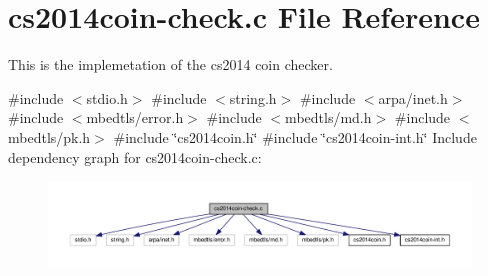 \hypertarget{cs2014coin-check_8c}{}\section{cs2014coin-\/check.c File Reference}
\label{cs2014coin-check_8c}


This is the implemetation of the cs2014 coin checker.  


{\ttfamily \#include $<$stdio.\+h$>$}\newline
{\ttfamily \#include $<$string.\+h$>$}\newline
{\ttfamily \#include $<$arpa/inet.\+h$>$}\newline
{\ttfamily \#include $<$mbedtls/error.\+h$>$}\newline
{\ttfamily \#include $<$mbedtls/md.\+h$>$}\newline
{\ttfamily \#include $<$mbedtls/pk.\+h$>$}\newline
{\ttfamily \#include \char`\"{}cs2014coin.\+h\char`\"{}}\newline
{\ttfamily \#include \char`\"{}cs2014coin-\/int.\+h\char`\"{}}\newline
Include dependency graph for cs2014coin-\/check.c\+:\nopagebreak
\begin{figure}[H]
\begin{center}
\leavevmode
\includegraphics[width=350pt]{cs2014coin-check_8c__incl}
\end{center}
\end{figure}
